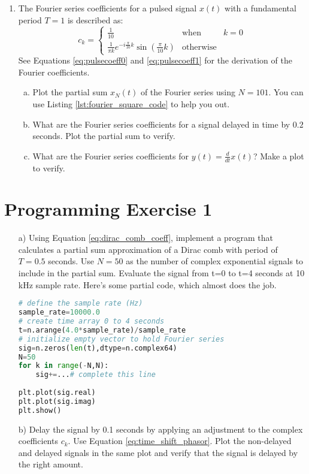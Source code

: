 \begin{enumerate}
\item The Fourier series coefficients for a pulsed signal $x(t)$ with
  a fundamental period $T=1$ is described as:
  \begin{equation}
    c_k = \left\{\begin{array}{ccc}
    \frac{1}{10} & \mathrm{when} & k=0 \\
    \frac{1}{\pi k}e^{-i\frac{\pi}{10}  k }\sin\left(\frac{\pi}{10} k  \right) & \mathrm{otherwise}
    \end{array}
    \right.
  \end{equation}
  See Equations \ref{eq:pulsecoeff0} and \ref{eq:pulsecoeff1} for the derivation of the Fourier coefficients.
  \begin{enumerate}[a)]
  \item Plot the partial sum $x_N(t)$ of the Fourier series using $N=101$. You can use Listing \ref{lst:fourier_square_code} to help you out.
  \item What are the Fourier series coefficients for a signal delayed in time by $0.2$ seconds. Plot the partial sum to verify.
  \item What are the Fourier series coefficients for $y(t)=\frac{d}{dt}x(t)$? Make a plot to verify.
  \end{enumerate}
  
\end{enumerate}


\section{Programming Exercise 1}

\begin{itemize}
\item[a)] 
Using Equation \ref{eq:dirac_comb_coeff}, implement a program that
calculates a partial sum approximation of a Dirac comb with
period of $T=0.5$ seconds. Use $N=50$ as the number of complex
exponential signals to include in the partial sum. Evaluate the signal
from t=0 to t=4 seconds at 10 kHz sample rate. Here's some partial
code, which almost does the job.
\begin{lstlisting}[language=Python,numbers=none]
# define the sample rate (Hz)
sample_rate=10000.0
# create time array 0 to 4 seconds
t=n.arange(4.0*sample_rate)/sample_rate
# initialize empty vector to hold Fourier series
sig=n.zeros(len(t),dtype=n.complex64)
N=50
for k in range(-N,N):
    sig+=...# complete this line
    
plt.plot(sig.real)
plt.plot(sig.imag)
plt.show()
\end{lstlisting}

\item[b)] Delay the signal by 0.1 seconds by applying an adjustment to the complex coefficients $c_k$. Use Equation \ref{eq:time_shift_phasor}. Plot the non-delayed and delayed signals in the same plot and verify that the signal is delayed by the right amount.
\end{itemize}


\fi
